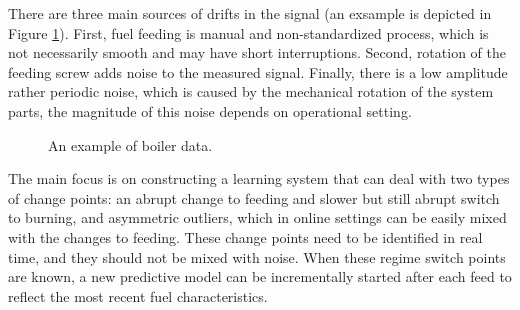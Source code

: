 \documentclass{llncs}
\begin{document}
There are three main sources of drifts in the signal (an exsample is depicted in Figure \ref{fig:sig}).
First, fuel feeding is manual and non-standardized process, which is not necessarily smooth and may have short interruptions.
Second, rotation of the feeding screw adds noise to the measured signal.
Finally, there is a low amplitude rather periodic noise, which is caused by the mechanical rotation of the system parts, the magnitude of this noise depends on operational setting.
\begin{figure}[t]
\centering
{}
\caption{An example of boiler data.}
\label{fig:sig}
\end{figure}

The main focus is on constructing a learning system that can deal with two types of change points:
an abrupt change to feeding and slower but still abrupt switch to burning,
and asymmetric outliers, %
which in online settings can be easily mixed with the changes to feeding.
These change points need to be identified in real time, and they should not be mixed with noise.
When these regime switch points are known, a new predictive model can be incrementally started after each feed to reflect the most recent fuel characteristics.
\end{document}
